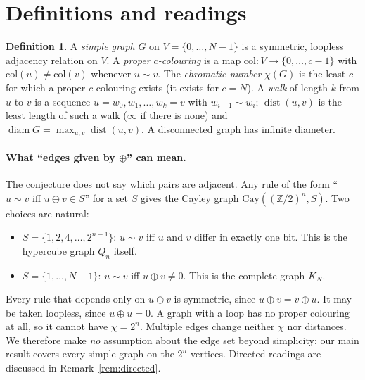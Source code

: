 \documentclass[11pt]{article}
\theoremstyle{definition}
\newtheorem{definition}[theorem]{Definition}
\theoremstyle{remark}
\begin{document}
\section{Definitions and readings}
\begin{definition}
A \emph{simple graph} $G$ on $V=\{0,\dots,N-1\}$ is a symmetric, loopless
adjacency relation on $V$. A \emph{proper $c$-colouring} is a map
$\mathrm{col}:V\to\{0,\dots,c-1\}$ with $\mathrm{col}(u)\ne\mathrm{col}(v)$
whenever $u\sim v$. The \emph{chromatic number} $\chi(G)$ is the least $c$ for
which a proper $c$-colouring exists (it exists for $c=N$). A \emph{walk} of
length $k$ from $u$ to $v$ is a sequence $u=w_0,w_1,\dots,w_k=v$ with
$w_{i-1}\sim w_i$; $\operatorname{dist}(u,v)$ is the least length of such a walk
($\infty$ if there is none) and $\operatorname{diam}G=\max_{u,v}\operatorname{dist}(u,v)$.
A disconnected graph has infinite diameter.
\end{definition}

\paragraph{What ``edges given by $\oplus$'' can mean.} The conjecture does not
say which pairs are adjacent. Any rule of the form ``$u\sim v$ iff $u\oplus v\in
S$'' for a set $S$ gives the Cayley graph $\mathrm{Cay}((\mathbb Z/2)^n,S)$. Two
choices are natural:
\begin{itemize}
\item[(H)] $S=\{1,2,4,\dots,2^{n-1}\}$: $u\sim v$ iff $u$ and $v$ differ in exactly
one bit. This is the hypercube graph $Q_n$ itself.
\item[(K)] $S=\{1,\dots,N-1\}$: $u\sim v$ iff $u\oplus v\ne0$. This is the complete
graph $K_N$.
\end{itemize}
Every rule that depends only on $u\oplus v$ is symmetric, since $u\oplus
v=v\oplus u$. It may be taken loopless, since $u\oplus u=0$. A graph with a
loop has no proper colouring at all, so it cannot have $\chi=2^n$. Multiple
edges change neither $\chi$ nor distances. We therefore make \emph{no}
assumption about the edge set beyond simplicity: our main result covers every
simple graph on the $2^n$ vertices. Directed readings are discussed in
Remark~\ref{rem:directed}.
\end{document}
